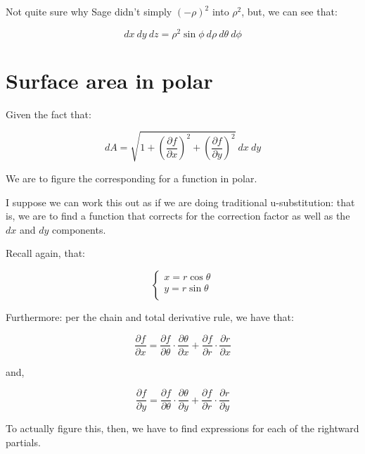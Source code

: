 \documentclass[letterpaper]{article}
\begin{document}
Not quite sure why Sage didn't simply \((-\rho)^2\) into \(\rho^2\), but, we can see that:

\begin{equation}
   dx\ dy\ dz = \rho^2\sin\phi\ d\rho\ d \theta\ d\phi 
\end{equation}

\section{Surface area in polar}
\label{sec:orgdcd8111}
Given the fact that:

\begin{equation}
  dA = \sqrt{1 + \left(\frac{\partial f}{\partial x}\right)^2 + \left(\frac{\partial f}{\partial y}\right)^2}\ dx\ dy
\end{equation}

We are to figure the corresponding for a function in polar.

I suppose we can work this out as if we are doing traditional u-substitution: that is, we are to find a function that corrects for the correction factor as well as the \(dx\) and \(dy\) components.

Recall again, that:

\begin{equation}
   \begin{cases}
   x = r\cos\theta \\
   y = r\sin\theta \\
\end{cases}
\end{equation}

Furthermore: per the chain and total derivative rule, we have that:

\begin{equation}
   \frac{\partial f}{\partial x} = \frac{\partial f}{\partial \theta}\cdot \frac{\partial \theta}{\partial x} + \frac{\partial f}{\partial r}\cdot \frac{\partial r}{\partial x}
\end{equation}

and,

\begin{equation}
   \frac{\partial f}{\partial y} = \frac{\partial f}{\partial \theta}\cdot \frac{\partial \theta}{\partial y} + \frac{\partial f}{\partial r}\cdot \frac{\partial r}{\partial y}
\end{equation}

To actually figure this, then, we have to find expressions for each of the rightward partials.
\end{document}
